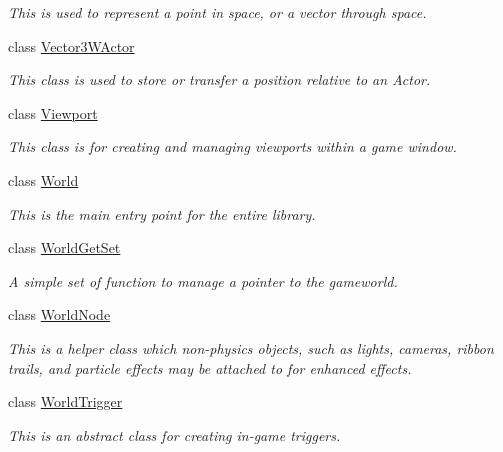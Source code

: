 \begin{DoxyCompactItemize}
\begin{DoxyCompactList}\small\item\em This is used to represent a point in space, or a vector through space. \item\end{DoxyCompactList}\item 
class \hyperlink{classMezzanine_1_1Vector3WActor}{Vector3WActor}
\begin{DoxyCompactList}\small\item\em This class is used to store or transfer a position relative to an Actor. \item\end{DoxyCompactList}\item 
class \hyperlink{classMezzanine_1_1Viewport}{Viewport}
\begin{DoxyCompactList}\small\item\em This class is for creating and managing viewports within a game window. \item\end{DoxyCompactList}\item 
class \hyperlink{classMezzanine_1_1World}{World}
\begin{DoxyCompactList}\small\item\em This is the main entry point for the entire library. \item\end{DoxyCompactList}\item 
class \hyperlink{classMezzanine_1_1WorldGetSet}{WorldGetSet}
\begin{DoxyCompactList}\small\item\em A simple set of function to manage a pointer to the gameworld. \item\end{DoxyCompactList}\item 
class \hyperlink{classMezzanine_1_1WorldNode}{WorldNode}
\begin{DoxyCompactList}\small\item\em This is a helper class which non-\/physics objects, such as lights, cameras, ribbon trails, and particle effects may be attached to for enhanced effects. \item\end{DoxyCompactList}\item 
class \hyperlink{classMezzanine_1_1WorldTrigger}{WorldTrigger}
\begin{DoxyCompactList}\small\item\em This is an abstract class for creating in-\/game triggers. \item\end{DoxyCompactList}\end{DoxyCompactItemize}
